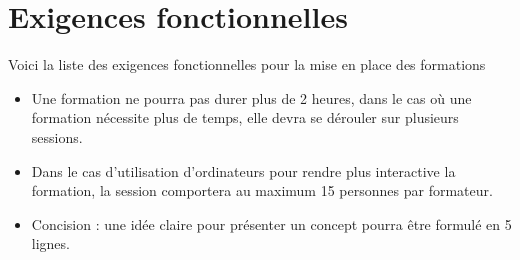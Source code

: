\section{Exigences fonctionnelles}


Voici la liste des exigences fonctionnelles pour la mise en place des formations

\begin{itemize}

\item Une formation ne pourra pas durer plus de 2 heures, dans le cas où une
formation nécessite plus de temps, elle devra se dérouler sur plusieurs sessions.

\item Dans le cas d'utilisation d'ordinateurs pour rendre plus interactive la
formation, la session comportera au maximum 15 personnes par formateur.

\item Concision : une idée claire pour présenter un concept pourra être formulé
en 5 lignes. 

\end{itemize}

